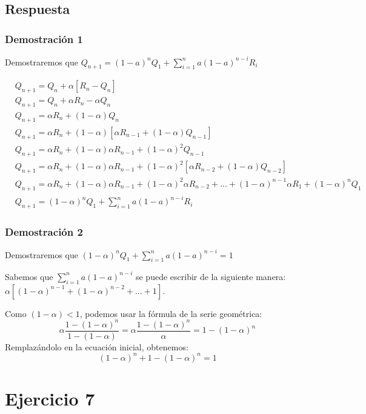\documentclass[12pt,a4paper]{article}
\begin{document}
\subsection{Respuesta}

\subsubsection{Demostración 1}

Demostraremos que $ Q_{n+1} = (1-a)^n Q_1 + \sum_{i=1}^{n} a(1-a)^{n-i}R_i $

\begin{align}
\tag{1} & Q_{n+1} = Q_n + \alpha[R_n - Q_n] \\
\tag{2} & Q_{n+1} = Q_n + \alpha R_n - \alpha Q_n \\
\tag{3} & Q_{n+1} = \alpha R_n + (1-\alpha) Q_n \\
\tag{4} & Q_{n+1} = \alpha R_n + (1-\alpha) [\alpha R_{n-1} + (1-\alpha) Q_{n-1}] \\
\tag{5} & Q_{n+1} = \alpha R_n + (1-\alpha) \alpha R_{n-1} + (1-\alpha)^2 Q_{n-1} \\
\tag{6} & Q_{n+1} = \alpha R_n + (1-\alpha) \alpha R_{n-1} + (1-\alpha)^2 [\alpha R_{n-2} + (1-\alpha) Q_{n-2}] \\
\tag{7} & Q_{n+1} = \alpha R_n + (1-\alpha) \alpha R_{n-1} + (1-\alpha)^2 \alpha R_{n-2}+\dots+(1-\alpha)^{n-1} \alpha R_1 + (1-\alpha)^n Q_1 \\
\tag{8} & Q_{n+1} = (1-\alpha)^n Q_1 + \sum_{i=1}^{n} a(1-a)^{n-i}R_i
\end{align}

\subsubsection{Demostración 2}

Demostraremos que $ (1-\alpha)^n Q_1 + \sum_{i=1}^{n} a(1-a)^{n-i} = 1 $

Sabemos que $\sum_{i=1}^{n} a(1-a)^{n-i}$ se puede escribir de la siguiente
manera: $\alpha [(1-\alpha)^{n-1} + (1-\alpha)^{n-2} + ... + 1]$.

Como $(1-\alpha)<1$, podemos usar la fórmula de la serie geométrica:
$$\alpha \frac{1-(1-\alpha)^{n}}{1-(1-\alpha)} = \alpha \frac{1-(1-\alpha)^{n}}{\alpha} = 1 - (1-\alpha)^{n}$$
Remplazándolo en la ecuación inicial, obtenemos:
$$(1-\alpha)^n + 1 - (1-\alpha)^{n} = 1$$

\section{Ejercicio 7} %
\end{document}
